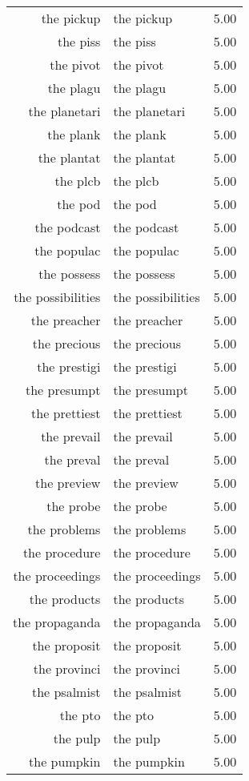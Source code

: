 \begin{table}[ht]
\begin{tabular}{rlr}
  the pickup & the pickup & 5.00 \\ 
  the piss & the piss & 5.00 \\ 
  the pivot & the pivot & 5.00 \\ 
  the plagu & the plagu & 5.00 \\ 
  the planetari & the planetari & 5.00 \\ 
  the plank & the plank & 5.00 \\ 
  the plantat & the plantat & 5.00 \\ 
  the plcb & the plcb & 5.00 \\ 
  the pod & the pod & 5.00 \\ 
  the podcast & the podcast & 5.00 \\ 
  the populac & the populac & 5.00 \\ 
  the possess & the possess & 5.00 \\ 
  the possibilities & the possibilities & 5.00 \\ 
  the preacher & the preacher & 5.00 \\ 
  the precious & the precious & 5.00 \\ 
  the prestigi & the prestigi & 5.00 \\ 
  the presumpt & the presumpt & 5.00 \\ 
  the prettiest & the prettiest & 5.00 \\ 
  the prevail & the prevail & 5.00 \\ 
  the preval & the preval & 5.00 \\ 
  the preview & the preview & 5.00 \\ 
  the probe & the probe & 5.00 \\ 
  the problems & the problems & 5.00 \\ 
  the procedure & the procedure & 5.00 \\ 
  the proceedings & the proceedings & 5.00 \\ 
  the products & the products & 5.00 \\ 
  the propaganda & the propaganda & 5.00 \\ 
  the proposit & the proposit & 5.00 \\ 
  the provinci & the provinci & 5.00 \\ 
  the psalmist & the psalmist & 5.00 \\ 
  the pto & the pto & 5.00 \\ 
  the pulp & the pulp & 5.00 \\ 
  the pumpkin & the pumpkin & 5.00 \\ 

\end{tabular}
\end{table}
